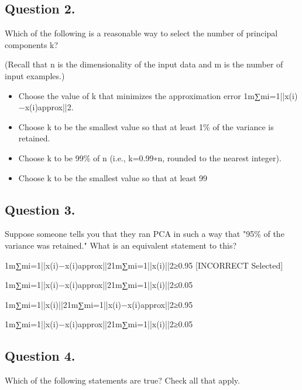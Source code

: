 
\subsection{ Question 2. }
Which of the following is a reasonable way to select the number of principal components k?

(Recall that n is the dimensionality of the input data and m is the number of input examples.)

\begin{itemize}
\item Choose the value of k that minimizes the approximation error 1m∑mi=1||x(i)−x(i)approx||2.

\item Choose k to be the smallest value so that at least 1\% of the variance is retained.

\item Choose k to be 99\% of n (i.e., k=0.99∗n, rounded to the nearest integer).

\item Choose k to be the smallest value so that at least 99%

\end{itemize}
\subsection{ Question 3. }
Suppose someone tells you that they ran PCA in such a way that "95\% of the variance was retained." What is an equivalent statement to this?

1m∑mi=1||x(i)−x(i)approx||21m∑mi=1||x(i)||2≥0.95 [INCORRECT Selected]

1m∑mi=1||x(i)−x(i)approx||21m∑mi=1||x(i)||2≤0.05

1m∑mi=1||x(i)||21m∑mi=1||x(i)−x(i)approx||2≥0.95

1m∑mi=1||x(i)−x(i)approx||21m∑mi=1||x(i)||2≥0.05

\subsection{ Question 4. }
Which of the following statements are true? Check all that apply.

